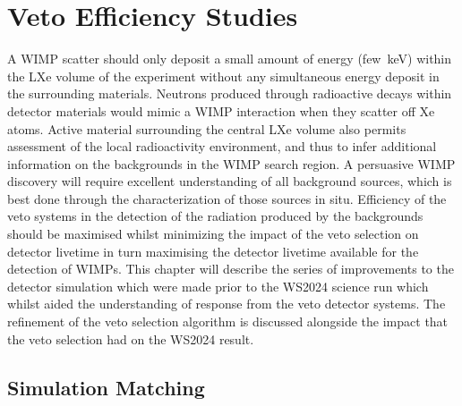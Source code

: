 \chapter{Veto Efficiency Studies}\label{chap:VetoEfficiency}
A WIMP scatter should only deposit a small amount of energy (few~keV) within the LXe volume of the experiment without any simultaneous energy deposit in the surrounding materials. Neutrons produced through radioactive decays within detector materials would mimic a WIMP interaction when they scatter off Xe atoms. Active material surrounding the central LXe volume also permits assessment of the local radioactivity environment, and thus to infer additional information on the backgrounds in the WIMP search region. A persuasive WIMP discovery will require excellent understanding of all background sources, which is best done through the characterization of those sources in situ. Efficiency of the veto systems in the detection of the radiation produced by the backgrounds should be maximised whilst minimizing the impact of the veto selection on detector livetime in turn maximising the detector livetime available for the detection of WIMPs. This chapter will describe the series of improvements to the detector simulation which were made prior to the WS2024 science run which whilst aided the understanding of response from the veto detector systems. The refinement of the veto selection algorithm is discussed alongside the impact that the veto selection had on the WS2024 result.

\section{Simulation Matching}\label{sec:simulation_improvements}

